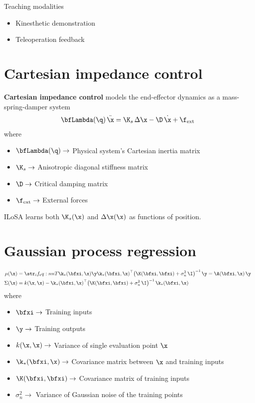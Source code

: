 

Teaching modalities
\begin{itemize}
    \item Kinesthetic demonstration
    \item Teleoperation feedback
\end{itemize}

\section{Cartesian impedance control}

\textbf{Cartesian impedance control} models the end-effector dynamics as a mass-spring-damper system
\begin{equation*}
    \func{\bfLambda}{\q} \, \ddot\x
    =
    \K_s \, \Delta\x
    -
    \D \, \dot\x
    +
    \f_{\text{ext}}
\end{equation*}
where
\begin{itemize}
    \item \( \func{\bfLambda}{\q} \to \) Physical system's Cartesian inertia matrix
    \item \( \K_s \to \) Anisotropic diagonal stiffness matrix
    \item \( \D \to \) Critical damping matrix
    \item \( \f_{\text{ext}} \to \) External forces
\end{itemize}

ILoSA learns both \( \func{\K_s}{\x} \) and \( \func{\Delta\x}{\x} \) as functions of position.

\section{Gaussian process regression}

\begin{align*}
    \func{\mu}{\x}
    & =
    \qf
    {\func{\k_\ast}{\bfxi, \x}}
    {\inv{\pbrac{
                \func{\K}{\bfxi, \bfxi}
                +
                \sigma_n^2 \, \I
    }}}
    [\y]
    =
    \func{\A}{\bfxi, \x} \, \y
    \\
    \func{\Sigma}{\x}
    & =
    \func{k}{\x, \x}
    -
    \qf
    {\func{\k_\ast}{\bfxi, \x}}
    {\inv{\pbrac{
                \func{\K}{\bfxi, \bfxi}
                +
                \sigma_n^2 \, \I
    }}}
\end{align*}
where
\begin{itemize}
    \item \( \bfxi \to \) Training inputs
    \item \( \y \to \) Training outputs
    \item \( \func{k}{\x, \x} \to \) Variance of single evaluation point \( \x \)
    \item \( \func{\k_\ast}{\bfxi, \x} \to \) Covariance matrix between \( \x \) and training inputs
    \item \( \func{\K}{\bfxi, \bfxi} \to \) Covariance matrix of training inputs
    \item \( \sigma_n^2 \to \) Variance of Gaussian noise of the training points
\end{itemize}
